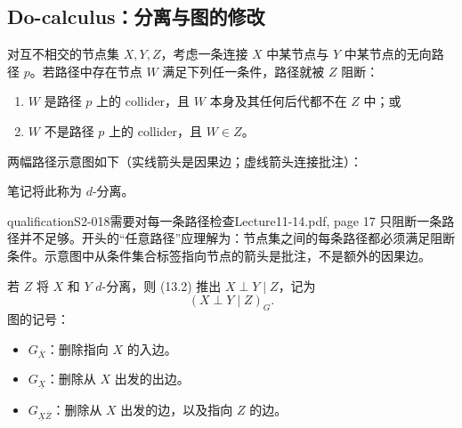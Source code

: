 \subsection{Do-calculus：分离与图的修改}
对互不相交的节点集 $X,Y,Z$，考虑一条连接 $X$ 中某节点与 $Y$ 中某节点的无向路径 $p$。若路径中存在节点 $W$ 满足下列任一条件，路径就被 $Z$ 阻断：
\begin{enumerate}
 \item $W$ 是路径 $p$ 上的 collider，且 $W$ 本身及其任何后代都不在 $Z$ 中；或
 \item $W$ 不是路径 $p$ 上的 collider，且 $W\in Z$。
\end{enumerate}
两幅路径示意图如下（实线箭头是因果边；虚线箭头连接批注）：
\begin{center}
\end{center}
笔记将此称为 $d$-分离。
\begin{reviewnote}{qualification}{S2-018}{需要对每一条路径检查}{Lecture11-14.pdf, page 17}
只阻断一条路径并不足够。开头的“任意路径”应理解为：节点集之间的每条路径都必须满足阻断条件。示意图中从条件集合标签指向节点的箭头是批注，不是额外的因果边。
\end{reviewnote}


若 $Z$ 将 $X$ 和 $Y$ $d$-分离，则 (13.2) 推出 $X\perp Y\mid Z$，记为
\[
 (X\perp Y\mid Z)_G.
\]
图的记号：
\begin{itemize}
 \item $G_{\overline X}$：删除指向 $X$ 的入边。
 \item $G_{\underline X}$：删除从 $X$ 出发的出边。
 \item $G_{\underline X\overline Z}$：删除从 $X$ 出发的边，以及指向 $Z$ 的边。
\end{itemize}

